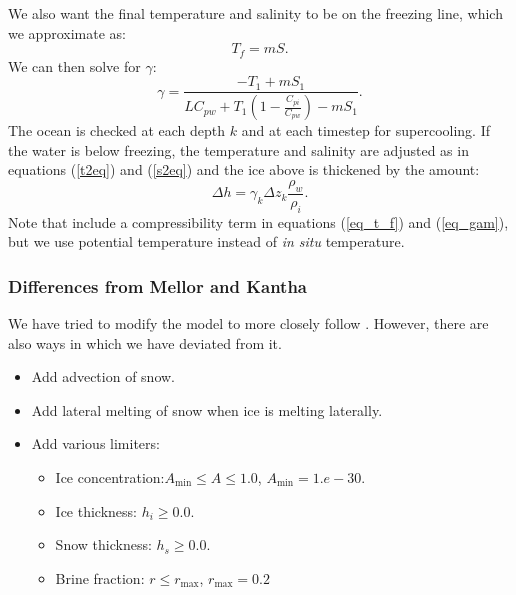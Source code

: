 We also want the final temperature and salinity to be on the freezing
line, which we approximate as:
\begin{equation}
   T_f = m S .
  \label{eq_t_f}
\end{equation}
We can then solve for $\gamma$:
\begin{equation}
   \gamma = \frac{-T_1 + mS_1 }{ {L }{ C_{pw}}+ T_1 \left( 1
   - \frac{C_{pi} }{ C_{pw}} \right) - mS_1} .
  \label{eq_gam}
\end{equation}
The ocean is checked at each depth $k$ and at each timestep for
supercooling.  If the water is below freezing, the temperature and
salinity are adjusted as in equations (\ref{t2eq}) and (\ref{s2eq})
and the ice above is thickened by the amount:
\begin{equation}
   \Delta h = \gamma_k \Delta z_k \frac{\rho_w}{\rho_i} .
\end{equation}
Note that \citet{Steele89} include a compressibility term in equations
(\ref{eq_t_f}) and (\ref{eq_gam}), but we use potential temperature
instead of {\em in situ} temperature.

\subsubsection{Differences from Mellor and Kantha}
We have tried to modify the  model to more closely follow
\citet{Mellor89}. However, there are also ways in which we have deviated from it.
\begin{itemize}
  \item Add advection of snow.
  \item Add lateral melting of snow when ice is melting laterally.
  \item Add various limiters:
    \begin{itemize}
      \item Ice concentration:$A_{\min} \leq A \leq 1.0$, $A_{\min} =
      1.e-30$.
      \item Ice thickness: $h_i \geq 0.0$.
      \item Snow thickness: $h_s \geq 0.0$.
      \item Brine fraction: $r \leq r_{\max}$, $r_{\max} = 0.2$
    \end{itemize}
\end{itemize}
